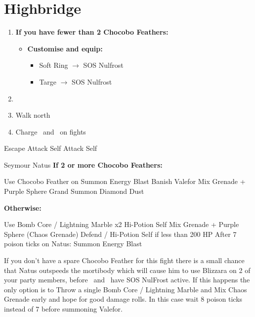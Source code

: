 \chapter{Highbridge}
\begin{enumerate}
	\item \textbf{If you have fewer than 2 Chocobo Feathers:}
		\begin{itemize}
			\item \textbf{Customise and equip:}
				\begin{itemize}
					\item Soft Ring $\rightarrow$ SOS Nulfrost
					\item Targe $\rightarrow$ SOS Nulfrost						
				\end{itemize}
		\end{itemize}
	\item \formation{\tidus}{\yuna}{\rikku}
	\item Walk north
	\item Charge \yuna\ and \rikku\ \od on fights
\end{enumerate}
\begin{encounters}
	\begin{itemize}
		\tidusf Escape
		\rikkuf Attack Self
		\yunaf Attack Self
	\end{itemize}
\end{encounters}
\begin{battle}[36000]{Seymour Natus}
\textbf{If 2 or more Chocobo Feathers:}
	\begin{itemize}
		\switch{\tidus}{\rikku}
		\rikkuf Use Chocobo Feather on \yuna
		\yunaf Summon \valefor
		\valeforf Energy Blast
		\enemyf Banish Valefor
		\rikkuf Mix Grenade + Purple Sphere
		\yunaf Grand Summon \shiva
		\shivaf Diamond Dust
	\end{itemize}
\textbf{Otherwise:}
	\begin{itemize}
		\switch{\tidus}{\rikku}
		\rikkuf Use Bomb Core / Lightning Marble x2
		\yunaf Hi-Potion Self
		\rikkuf Mix Grenade + Purple Sphere (Chaos Grenade)
		\yunaf Defend / Hi-Potion Self if less than 200 HP
		\yunaf After 7 poison ticks on Natus: Summon \valefor
		\valeforf Energy Blast
	\end{itemize}
\vspace{\baselineskip}
If you don't have a spare Chocobo Feather for this fight there is a small chance that Natus outspeeds the mortibody which will cause him to use Blizzara on 2 of your party members, before \rikku\ and \yuna\ have SOS NulFrost active. If this happens the only option is to Throw a single Bomb Core / Lightning Marble and Mix Chaos Grenade early and hope for good damage rolls. In this case wait 8 poison ticks instead of 7 before summoning Valefor.
\end{battle}

